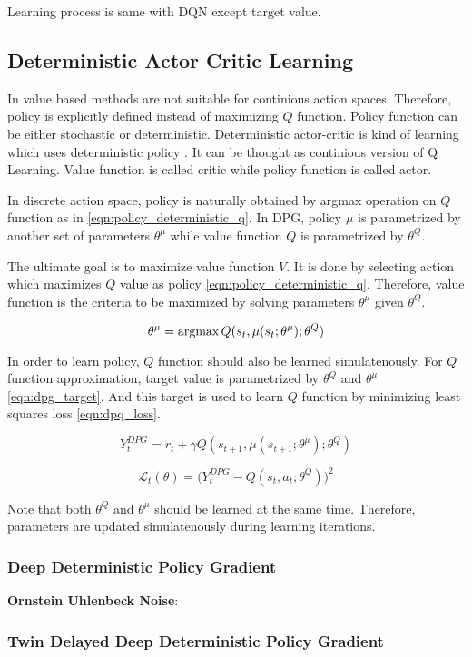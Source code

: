 Learning process is same with DQN except target value.

\subsection{Deterministic Actor Critic Learning}
In value based methods are not suitable for continious action spaces. Therefore, policy is explicitly defined instead of maximizing $Q$ function. Policy function can be either stochastic or deterministic.  Deterministic actor-critic is kind of learning which uses deterministic policy \cite{silver_deterministic_2014}. It can be thought as continious version of Q Learning. Value function is called critic while policy function is called actor.

In discrete action space, policy is naturally obtained by argmax operation on $Q$ function as in \ref{eqn:policy_deterministic_q}. In DPG, policy $\mu$ is parametrized by another set of parameters $\theta^\mu$ while value function $Q$ is parametrized by $\theta^Q$. 

The ultimate goal is to maximize value function $V$. It is done by selecting action which maximizes $Q$ value as policy \ref{eqn:policy_deterministic_q}. Therefore, value function is the criteria to be maximized by solving parameters $\theta^\mu$ given $\theta^Q$. 

\begin{equation}
\label{eqn:dpg_value_maximization}
\theta^\mu = \operatorname{\textup{argmax}} Q(s_t, \mu(s_t;\theta^\mu);\theta^Q)
\end{equation}

In order to learn policy, $Q$ function should also be learned simulatenously. For $Q$ function approximation, target value is parametrized by $\theta^Q$ and $\theta^\mu$ \ref{eqn:dpg_target}. And this target is used to learn $Q$ function by minimizing least squares loss \ref{eqn:dpq_loss}.

\begin{equation}
\label{eqn:dpg_target}
Y_t^{DPG} = r_t + \gamma Q(s_{t+1}, \mu(s_{t+1};\theta^\mu);\theta^Q)
\end{equation}

\begin{equation}
\label{eqn:dpq_loss}
\mathcal{L}_t(\theta) = \big( Y_t^{DPG} - Q(s_t,a_t;\theta^Q) \big) ^ 2
\end{equation}

Note that both $\theta^Q$ and $\theta^\mu$ should be learned at the same time. Therefore, parameters are updated simulatenously during learning iterations.

\subsubsection{Deep Deterministic Policy Gradient}
\cite{lillicrap_continuous_2019}

\textbf{Ornstein Uhlenbeck Noise}: 

\subsubsection{Twin Delayed Deep Deterministic Policy Gradient}
\cite{fujimoto_addressing_2018}
